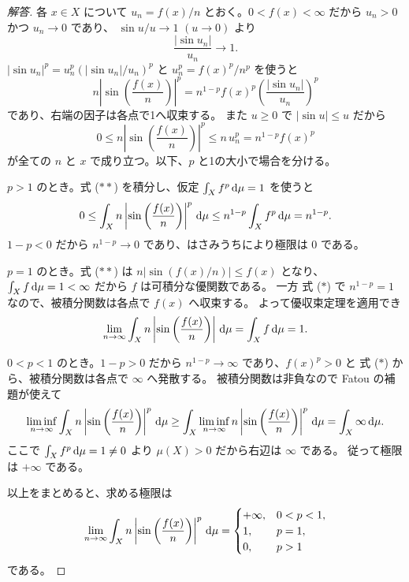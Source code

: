 \begin{proof}[解答]
各 $x\in X$ について $u_n=f(x)/n$ とおく。$0<f(x)<\infty$ だから $u_n>0$ かつ $u_n\to0$ であり、
$\sin u/u\to1$ $(u\to0)$ より
\[
\frac{|\sin u_n|}{u_n}\longrightarrow1.
\]
$|\sin u_n|^p=u_n^p\left(|\sin u_n|/u_n\right)^p$ と $u_n^p=f(x)^p/n^p$ を使うと
\[
n\left|\sin\left(\frac{f(x)}n\right)\right|^p
=n^{1-p}f(x)^p
\left(\frac{|\sin u_n|}{u_n}\right)^p
\tag{$*$}
\]
であり、右端の因子は各点で1へ収束する。
また $u\ge0$ で $|\sin u|\le u$ だから
\[
0\le n\left|\sin\left(\frac{f(x)}n\right)\right|^p
\le n\,u_n^p=n^{1-p}f(x)^p
\tag{$**$}
\]
が全ての $n$ と $x$ で成り立つ。以下、$p$ と1の大小で場合を分ける。

$p>1$ のとき。式 ($**$) を積分し、仮定 $\int_Xf^p\,\mathrm{d}\mu=1$ を使うと
\[
0\le\int_X n\left|\sin\left(\frac{f(x)}n\right)\right|^p\,\mathrm{d}\mu
\le n^{1-p}\int_Xf^p\,\mathrm{d}\mu=n^{1-p}.
\]
$1-p<0$ だから $n^{1-p}\to0$ であり、はさみうちにより極限は $0$ である。

$p=1$ のとき。式 ($**$) は $n|\sin(f(x)/n)|\le f(x)$ となり、
$\int_Xf\,\mathrm{d}\mu=1<\infty$ だから $f$ は可積分な優関数である。
一方 式 ($*$) で $n^{1-p}=1$ なので、被積分関数は各点で $f(x)$ へ収束する。
よって優収束定理を適用でき
\[
\lim_{n\to\infty}\int_X n\left|\sin\left(\frac{f(x)}n\right)\right|\,\mathrm{d}\mu
=\int_Xf\,\mathrm{d}\mu=1.
\]

$0<p<1$ のとき。$1-p>0$ だから $n^{1-p}\to\infty$ であり、$f(x)^p>0$ と
式 ($*$) から、被積分関数は各点で $\infty$ へ発散する。
被積分関数は非負なので Fatou の補題が使えて
\[
\liminf_{n\to\infty}\int_X n\left|\sin\left(\frac{f(x)}n\right)\right|^p\,\mathrm{d}\mu
\ge\int_X\liminf_{n\to\infty}
n\left|\sin\left(\frac{f(x)}n\right)\right|^p\,\mathrm{d}\mu
=\int_X\infty\,\mathrm{d}\mu.
\]
ここで $\int_Xf^p\,\mathrm{d}\mu=1\ne0$ より $\mu(X)>0$ だから右辺は $\infty$ である。
従って極限は $+\infty$ である。

以上をまとめると、求める極限は
\[
\lim_{n\to\infty}\int_X n\left|\sin\left(\frac{f(x)}n\right)\right|^p\,\mathrm{d}\mu
=\begin{cases}
+\infty,&0<p<1,\\
1,&p=1,\\
0,&p>1
\end{cases}
\]
である。
\end{proof}

